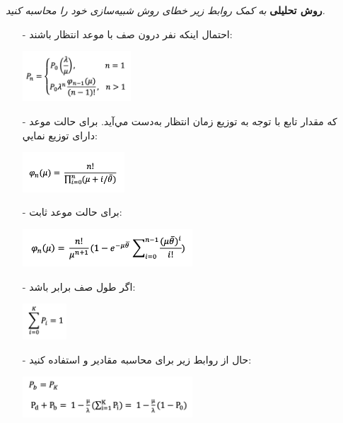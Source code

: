 \documentclass[12pt]{article}
\begin{document}
    \newpage
    \textbf{روش تحلیلی}
    \newline
    \textit{به‌ کمک روابط زیر خطای روش شبیه‌سازی خود را محاسبه کنید.}
    \begin{itemize}
	\item[-]
	احتمال اینکه  نفر درون صف  با موعد انتظار باشند:
	    \begin{center}
	        \raggedright
            \includegraphics[width=0.32\textwidth]{Content/2.1.png}
        \end{center}
    \item[-]
	که مقدار تابع  با توجه به توزیع زمان انتظار به‌دست مي‌آید. برای حالت موعد دارای توزیع نمایي:
	    \begin{center}
	        \raggedright
            \includegraphics[width=0.3\textwidth]{Content/2.2.png}
        \end{center}
    \item[-]
	برای حالت موعد ثابت:
	    \begin{center}
	        \raggedright
            \includegraphics[width=0.5\textwidth]{Content/2.3.png}
        \end{center}
    \item[-]
	اگر طول صف برابر  باشد:
	    \begin{center}
	        \raggedright
            \includegraphics[width=0.13\textwidth]{Content/2.4.png}
        \end{center}
    \item[-]
	حال از روابط زیر برای محاسبه مقادیر  و  استفاده کنید:
	    \begin{center}
	        \raggedright
            \includegraphics[width=0.5\textwidth]{Content/2.5.png}

\end{center}
\end{itemize}
\end{document}
